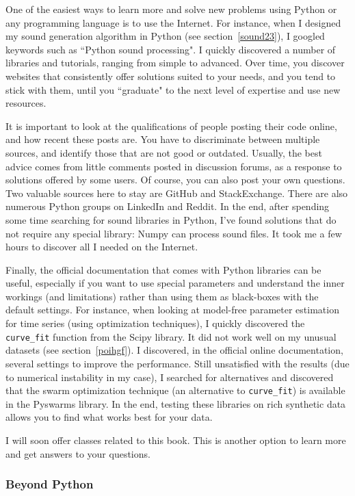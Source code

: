 \documentclass[oneside,10pt]{book}
\begin{document}
One of the easiest ways to learn more and solve new problems using Python or any programming language is to use the Internet. For instance, when I designed my
 sound generation algorithm in Python (see section~\ref{sound23}), I googled keywords such as ``Python sound processing". I quickly discovered a number of libraries and tutorials, ranging from simple to advanced.  Over time, you discover websites that consistently offer solutions suited to your needs, and you tend to stick with them, until you ``graduate" to the next level of expertise and use new resources.

It is important to look at the qualifications of people posting their code online, and how recent these posts are. You have to discriminate between multiple sources, and identify those that are not good or outdated. Usually, the best advice comes from little comments posted in discussion forums, as a response to solutions offered by some users. Of course, you can also post your own questions. Two valuable sources here to stay are GitHub and StackExchange. There are also numerous Python groups on LinkedIn and Reddit. In the end, after spending some time searching for sound libraries in Python, I've found solutions that do not require any special library: Numpy can process sound files. It took me a few hours to discover all I needed on the Internet.

Finally, the official documentation that comes with Python libraries can be useful, especially if you want to use special parameters and understand the inner workings (and limitations) rather than using them as black-boxes with the default settings. For instance, when looking at model-free parameter estimation for time series (using optimization techniques), I quickly discovered the
  \texttt{curve\_fit} function from the Scipy library. It did not work well on my unusual datasets (see section~\ref{poihgf}). I discovered, in the official online documentation, several settings
 to improve the performance. Still unsatisfied with the results (due to numerical instability in my case), I searched for alternatives and discovered that the swarm optimization technique (an alternative to \texttt{curve\_fit}) is available in the Pyswarms library. In the end, testing these libraries on rich synthetic data allows you to find what works best for your data.

I will soon offer classes related to this book. This is another option to learn more and get answers to your questions.

\subsubsection{Beyond Python}
\end{document}
